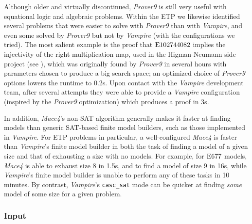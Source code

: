 Although older and virtually discontinued, \emph{Prover9} is still very useful with equational logic and algebraic problems. Within the ETP we likewise identified several problems that were easier to solve with \emph{Prover9} than with \emph{Vampire}, and even some solved by \emph{Prover9} but not by \emph{Vampire} (with the configurations we tried). The most salient example is the proof that $\mathrm{E}102744082$ implies the injectivity of the right multiplication map, used in the Higman-Neumann side project (see ), which was originally found by \emph{Prover9} in several hours with parameters chosen to produce a big search space; an optimized choice of \emph{Prover9} options lowers the runtime to 0.2s. Upon contact with the \emph{Vampire} development team, after several attempts they were able to provide a \emph{Vampire} configuration (inspired by the \emph{Prover9} optimization) which produces a proof in 3s.

In addition, \emph{Mace4}'s non-SAT algorithm generally makes it faster at finding models than generic SAT-based finite model builders, such as those implemented in \emph{Vampire}. For ETP problems in particular, a well-configured \emph{Mace4} is faster than \emph{Vampire}'s finite model builder in both the task of finding a model of a given size and that of exhausting a size with no models. For example, for $\mathrm{E}677$ models, \emph{Mace4} is able to exhaust size 8 in 1.5s, and to find a model of size 9 in 16s, while \emph{Vampire}'s finite model builder is unable to perform any of these tasks in 10 minutes. By contrast, \emph{Vampire}'s \verb|casc_sat| mode can be quicker at finding \emph{some} model of some size for a given problem.

\subsubsection{Input}\label{input}

